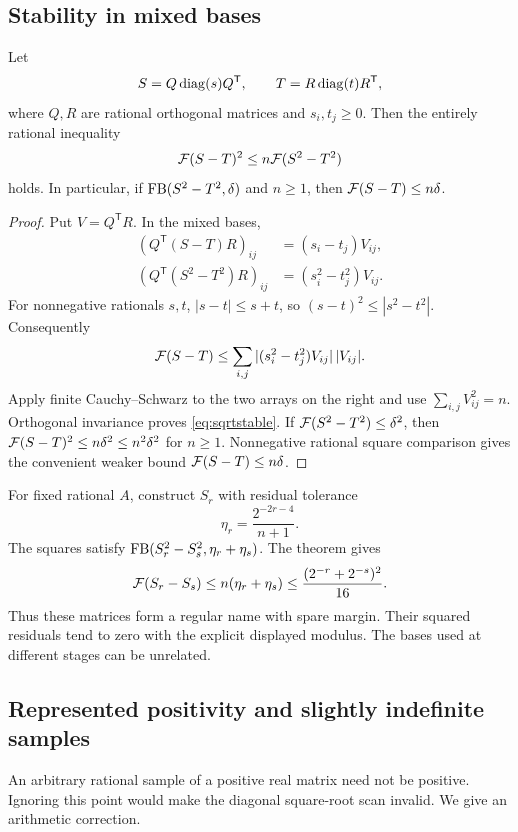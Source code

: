 \subsection{Stability in mixed bases}

\begin{theorem}
\label{thm:sqrtstable}
Let
\[
 S=Q\operatorname{diag}(s)Q^{\mathsf T},\qquad
 T=R\operatorname{diag}(t)R^{\mathsf T},
\]
where $Q,R$ are rational orthogonal matrices and $s_i,t_j\ge0$. Then the entirely rational inequality
\begin{equation}
 \mathcal F(S-T)^2\le n\mathcal F(S^2-T^2) \label{eq:sqrtstable}
\end{equation}
holds. In particular, if $\operatorname{FB}(S^2-T^2,\delta)$ and $n\ge1$, then
$\mathcal F(S-T)\le n\delta$.
\end{theorem}
\begin{proof}
Put $V=Q^{\mathsf T}R$. In the mixed bases,
\begin{align*}
 (Q^{\mathsf T}(S-T)R)_{ij}&=(s_i-t_j)V_{ij},\\
 (Q^{\mathsf T}(S^2-T^2)R)_{ij}&=(s_i^2-t_j^2)V_{ij}.
\end{align*}
For nonnegative rationals $s,t$, $|s-t|\le s+t$, so
$(s-t)^2\le|s^2-t^2|$. Consequently
\[
 \mathcal F(S-T)
 \le\sum_{i,j}|(s_i^2-t_j^2)V_{ij}|\,|V_{ij}|.
\]
Apply finite Cauchy--Schwarz to the two arrays on the right and use
$\sum_{i,j}V_{ij}^2=n$. Orthogonal invariance proves \eqref{eq:sqrtstable}. If $\mathcal F(S^2-T^2)\le\delta^2$, then
$\mathcal F(S-T)^2\le n\delta^2\le n^2\delta^2$ for $n\ge1$. Nonnegative rational square comparison gives the convenient weaker bound $\mathcal F(S-T)\le n\delta$.
\end{proof}

For fixed rational $A$, construct $S_r$ with residual tolerance
\[
 \eta_r=\frac{2^{-2r-4}}{n+1}.
\]
The squares satisfy $\operatorname{FB}(S_r^2-S_s^2,\eta_r+\eta_s)$. The theorem gives
\[
 \mathcal F(S_r-S_s)\le n(\eta_r+\eta_s)
 \le\frac{(2^{-r}+2^{-s})^2}{16}.
\]
Thus these matrices form a regular name with spare margin. Their squared residuals tend to zero with the explicit displayed modulus. The bases used at different stages can be unrelated.

\subsection{Represented positivity and slightly indefinite samples}
\label{sec:psdnames}

An arbitrary rational sample of a positive real matrix need not be positive. Ignoring this point would make the diagonal square-root scan invalid. We give an arithmetic correction.

